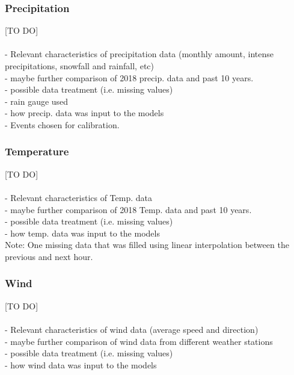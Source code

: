     
\subsubsection{Precipitation}
[TO DO]\\ \\
- Relevant characteristics of precipitation data (monthly amount, intense precipitations, snowfall and rainfall, etc)\\
- maybe further comparison of 2018 precip. data and past 10 years.\\
- possible data treatment (i.e. missing values)\\
- rain gauge used\\
- how precip. data was input to the models\\
- Events chosen for calibration.\\



\subsubsection{Temperature}

[TO DO]\\ \\
- Relevant characteristics of Temp. data \\
- maybe further comparison of 2018 Temp. data and past 10 years.\\
- possible data treatment (i.e. missing values)\\
- how temp. data was input to the models\\


Note: One missing data that was filled using linear interpolation between the previous and next hour.


\subsubsection{Wind}
[TO DO]\\ \\
- Relevant characteristics of wind data (average speed and direction) \\
- maybe further comparison of wind data from different weather stations \\
- possible data treatment (i.e. missing values)\\
- how wind data was input to the models\\


